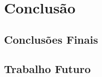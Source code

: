 ﻿\chapter{Conclus\~ao}
\label{chap:conclusao}

\section{Conclus\~oes Finais}
\label{sec:conc-sintese}

\section{Trabalho Futuro}
\label{sec:conc-futuro}
